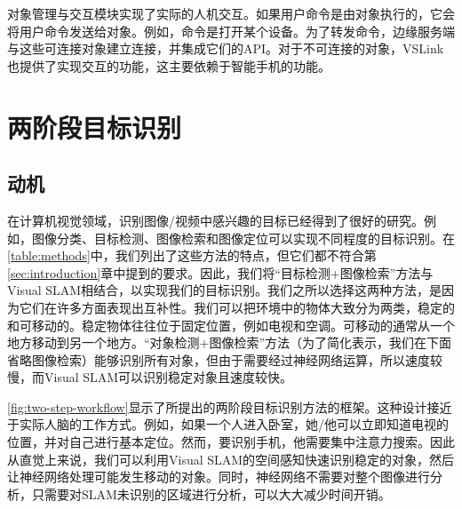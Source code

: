 对象管理与交互模块实现了实际的人机交互。如果用户命令是由对象执行的，它会将用户命令发送给对象。例如，命令是打开某个设备。为了转发命令，边缘服务端与这些可连接对象建立连接，并集成它们的API。对于不可连接的对象，VSLink也提供了实现交互的功能，这主要依赖于智能手机的功能。

\chapter{两阶段目标识别}\label{sec:fast}
\section{动机}\label{subsec:motivation}
在计算机视觉领域，识别图像/视频中感兴趣的目标已经得到了很好的研究。例如，图像分类\cite{he2019bag}、目标检测\cite{zou2019object}、图像检索\cite{philbin2008lost,zheng2017sift}和图像定位\cite{sattler2011fast}可以实现不同程度的目标识别。在\autoref{table:methods}中，我们列出了这些方法的特点，但它们都不符合第\ref{sec:introduction}章中提到的要求。因此，我们将“目标检测+图像检索”方法与Visual SLAM相结合，以实现我们的目标识别。我们之所以选择这两种方法，是因为它们在许多方面表现出互补性。我们可以把环境中的物体大致分为两类，稳定的和可移动的。稳定物体往往位于固定位置，例如电视和空调。可移动的通常从一个地方移动到另一个地方。“对象检测+图像检索”方法（为了简化表示，我们在下面省略图像检索）能够识别所有对象，但由于需要经过神经网络运算，所以速度较慢，而Visual SLAM可以识别稳定对象且速度较快。

\autoref{fig:two-step-workflow}显示了所提出的两阶段目标识别方法的框架。这种设计接近于实际人脑的工作方式。例如，如果一个人进入卧室，她/他可以立即知道电视的位置，并对自己进行基本定位。然而，要识别手机，他需要集中注意力搜索。因此从直觉上来说，我们可以利用Visual SLAM的空间感知快速识别稳定的对象，然后让神经网络处理可能发生移动的对象。同时，神经网络不需要对整个图像进行分析，只需要对SLAM未识别的区域进行分析，可以大大减少时间开销。


